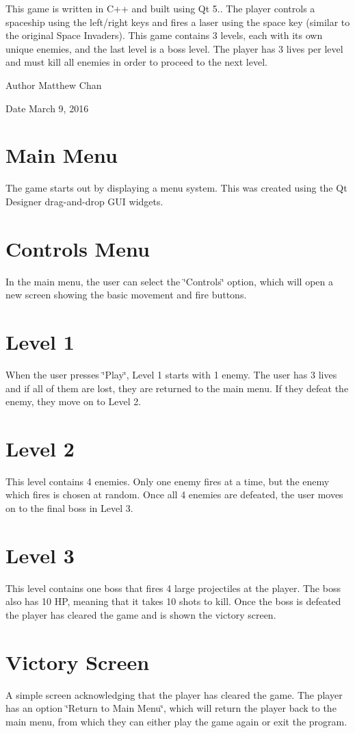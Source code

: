 This game is written in C++ and built using Qt 5.. The player controls a spaceship using the left/right keys and fires a laser using the space key (similar to the original Space Invaders). This game contains 3 levels, each with it\textquotesingle{}s own unique enemies, and the last level is a boss level. The player has 3 lives per level and must kill all enemies in order to proceed to the next level.\begin{DoxyAuthor}{Author}
Matthew Chan 
\end{DoxyAuthor}
\begin{DoxyDate}{Date}
March 9, 2016 
\end{DoxyDate}
\hypertarget{index_mainmenu}{}\section{Main Menu}\label{index_mainmenu}
The game starts out by displaying a menu system. This was created using the Qt Designer drag-\/and-\/drop G\+UI widgets.\hypertarget{index_controlsmenu}{}\section{Controls Menu}\label{index_controlsmenu}
In the main menu, the user can select the \char`\"{}\+Controls\char`\"{} option, which will open a new screen showing the basic movement and fire buttons.\hypertarget{index_level1menu}{}\section{Level 1}\label{index_level1menu}
When the user presses \char`\"{}\+Play\char`\"{}, Level 1 starts with 1 enemy. The user has 3 lives and if all of them are lost, they are returned to the main menu. If they defeat the enemy, they move on to Level 2.\hypertarget{index_level2menu}{}\section{Level 2}\label{index_level2menu}
This level contains 4 enemies. Only one enemy fires at a time, but the enemy which fires is chosen at random. Once all 4 enemies are defeated, the user moves on to the final boss in Level 3.\hypertarget{index_level3menu}{}\section{Level 3}\label{index_level3menu}
This level contains one boss that fires 4 large projectiles at the player. The boss also has 10 HP, meaning that it takes 10 shots to kill. Once the boss is defeated the player has cleared the game and is shown the victory screen.\hypertarget{index_victorymenu}{}\section{Victory Screen}\label{index_victorymenu}
A simple screen acknowledging that the player has cleared the game. The player has an option \char`\"{}\+Return to Main Menu\char`\"{}, which will return the player back to the main menu, from which they can either play the game again or exit the program. 